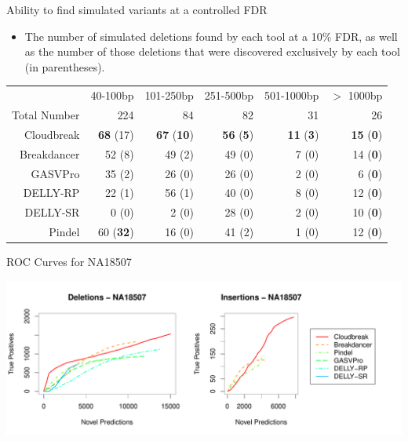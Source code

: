\documentclass{beamer}
\begin{document}
\begin{frame}{Ability to find simulated variants at a controlled FDR}
\begin{itemize}
\item The number of simulated deletions found by each tool at a 10\% FDR, as well as the number of those deletions that were discovered exclusively by each tool (in parentheses).
\end{itemize}
\begin{center}
\fontsize{7.5pt}{10}\selectfont
\begin{tabular}{rrrrrr}
  \hline
 & 40-100bp  & 101-250bp  & 251-500bp & 501-1000bp & $>$ 1000bp \\ 
 Total Number & 224 &  84 & 82 &  31 & 26\\ 
  \hline
  Cloudbreak  & \textbf{68} (17)  & \textbf{67} (\textbf{10}) &  \textbf{56} (\textbf{5}) & \textbf{11} (\textbf{3}) & \textbf{15} (\textbf{0}) \\ 
  Breakdancer & 52 (8)  & 49 (2) &  49 (0) & 7 (0) & 14 (\textbf{0}) \\ 
  GASVPro     & 35 (2)  & 26 (0) &  26 (0) & 2 (0) & 6 (\textbf{0}) \\ 
  DELLY-RP       & 22 (1)  & 56 (1) &  40 (0) & 8 (0) & 12 (\textbf{0}) \\ 
  DELLY-SR       & 0 (0)  & 2 (0) &  28 (0) & 2 (0) & 10 (\textbf{0}) \\ 
  Pindel      & 60 (\textbf{32})  & 16 (0) &  41 (2) & 1 (0) & 12 (\textbf{0})\\ 
   \hline
\end{tabular}
\end{center}
\end{frame}

\begin{frame}{ROC Curves for NA18507}
\begin{center}
  \includegraphics[trim=0 25 0 25, clip, width=1\textwidth]{NA18507_COMBINED_ROCS_POSTER.pdf}
\end{center}
\end{frame}
\end{document}
